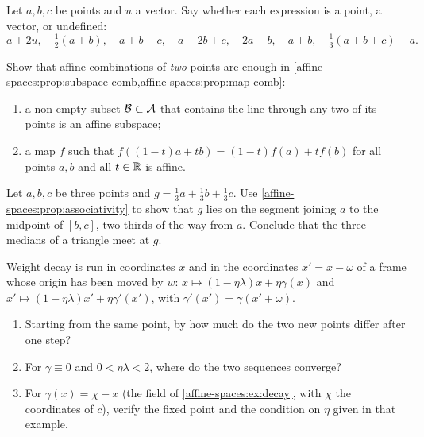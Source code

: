 \begin{notechapter}
\begin{exercise}\label{affine-spaces:exr:2}
Let $a, b, c$ be points and $u$ a vector. Say whether each expression is a
point, a vector, or undefined:
\[
  a + 2u,\quad \tfrac12(a + b),\quad a + b - c,\quad a - 2b + c,\quad
  2a - b,\quad a + b,\quad \tfrac13(a + b + c) - a .
\]
\end{exercise}

\begin{exercise}\label{affine-spaces:exr:3}
Show that affine combinations of \emph{two} points are enough in
\cref{affine-spaces:prop:subspace-comb,affine-spaces:prop:map-comb}:
\begin{enumerate}[nosep]
  \item a non-empty subset $\mathcal{B}\subset\mathcal{A}$ that contains the line through
        any two of its points is an affine subspace;
  \item a map $f$ such that $f((1 - t)a + tb) = (1 - t)f(a) + tf(b)$ for
        all points $a, b$ and all $t\in\mathbb{R}$ is affine.
\end{enumerate}
\end{exercise}

\begin{exercise}\label{affine-spaces:exr:4}
Let $a, b, c$ be three points and $g = \frac13a + \frac13b + \frac13c$.
Use \cref{affine-spaces:prop:associativity} to show that $g$ lies on the
segment joining $a$ to the midpoint of $[b, c]$, two thirds of the way
from $a$. Conclude that the three medians of a triangle meet at $g$.
\end{exercise}

\begin{exercise}\label{affine-spaces:exr:5}
Weight decay is run in coordinates $x$ and in the coordinates
$x' = x - \omega$ of a frame whose origin has been moved by $w$:
$x\mapsto(1 - \eta\lambda)x + \eta\gamma(x)$ and
$x'\mapsto(1 - \eta\lambda)x' + \eta\gamma'(x')$, with
$\gamma'(x') = \gamma(x' + \omega)$.
\begin{enumerate}[nosep]
  \item Starting from the same point, by how much do the two new points
        differ after one step?
  \item For $\gamma\equiv0$ and $0 < \eta\lambda < 2$, where do the two
        sequences converge?
  \item For $\gamma(x) = \chi - x$ (the field of
        \cref{affine-spaces:ex:decay}, with $\chi$ the coordinates of $c$),
        verify the fixed point and the condition on $\eta$ given in that
        example.
\end{enumerate}
\end{exercise}


\end{notechapter}
